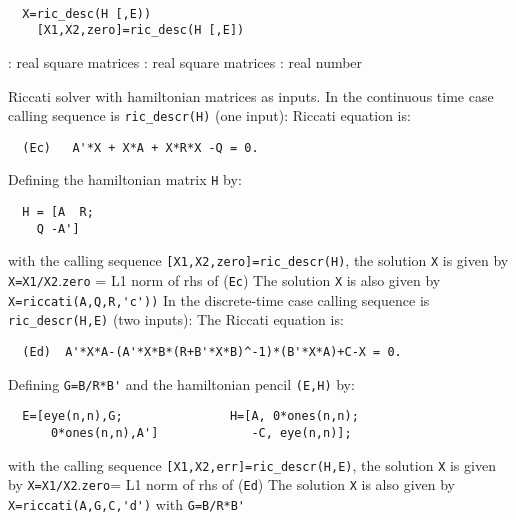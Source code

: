 \begin{mandesc}
   \\ %
\end{mandesc}
\begin{calling_sequence}
\begin{verbatim}
  X=ric_desc(H [,E))  
    [X1,X2,zero]=ric_desc(H [,E])  
\end{verbatim}
\end{calling_sequence}
\begin{parameters}
  \begin{varlist}
    : real square matrices
    : real square matrices
    : real number
  \end{varlist}
\end{parameters}
\begin{mandescription}
  Riccati solver with hamiltonian matrices as inputs.
  In the continuous time case calling sequence is \verb!ric_descr(H)! (one input):
  Riccati equation is:
\begin{verbatim}
  (Ec)   A'*X + X*A + X*R*X -Q = 0.
\end{verbatim}
  Defining the hamiltonian matrix \verb!H! by:
\begin{verbatim}
  H = [A  R;
    Q -A']
\end{verbatim}
  with the calling sequence \verb![X1,X2,zero]=ric_descr(H)!, the 
  solution \verb!X! is given by \verb!X=X1/X2!.\verb!zero! = L1 norm of rhs of (\verb!Ec!)
  The solution \verb!X! is also given by \verb!X=riccati(A,Q,R,'c'))!
  In the discrete-time case calling sequence is \verb!ric_descr(H,E)! (two inputs):
  The Riccati equation is:
\begin{verbatim}
  (Ed)  A'*X*A-(A'*X*B*(R+B'*X*B)^-1)*(B'*X*A)+C-X = 0.
\end{verbatim}
  Defining \verb!G=B/R*B'! and the hamiltonian pencil \verb!(E,H)! by:
\begin{verbatim}
  E=[eye(n,n),G;               H=[A, 0*ones(n,n);
      0*ones(n,n),A']             -C, eye(n,n)];
\end{verbatim}
  with the calling sequence \verb![X1,X2,err]=ric_descr(H,E)!, the 
  solution \verb!X! is given by \verb!X=X1/X2!.\verb!zero!= L1 norm of rhs of (\verb!Ed!)
  The solution \verb!X! is also given by \verb!X=riccati(A,G,C,'d')!  
  with \verb!G=B/R*B'!
\end{mandescription}
\begin{manseealso}
\end{manseealso}
